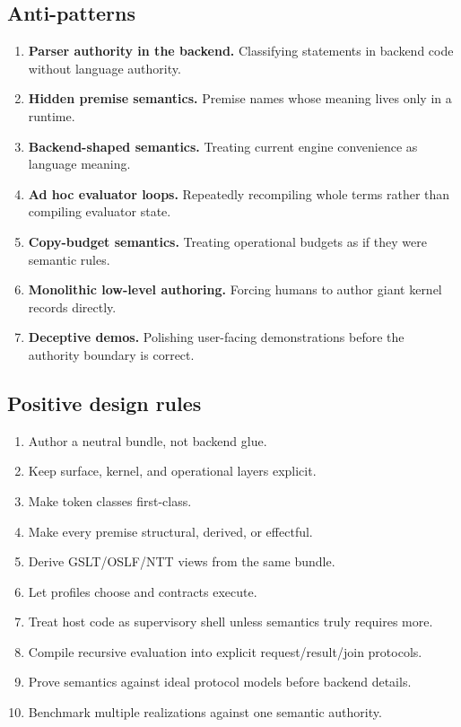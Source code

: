 \documentclass[11pt]{article}
\begin{document}
\subsection{Anti-patterns}

\begin{enumerate}[leftmargin=2em]
  \item \textbf{Parser authority in the backend.} Classifying statements in backend code without language authority.
  \item \textbf{Hidden premise semantics.} Premise names whose meaning lives only in a runtime.
  \item \textbf{Backend-shaped semantics.} Treating current engine convenience as language meaning.
  \item \textbf{Ad hoc evaluator loops.} Repeatedly recompiling whole terms rather than compiling evaluator state.
  \item \textbf{Copy-budget semantics.} Treating operational budgets as if they were semantic rules.
  \item \textbf{Monolithic low-level authoring.} Forcing humans to author giant kernel records directly.
  \item \textbf{Deceptive demos.} Polishing user-facing demonstrations before the authority boundary is correct.
\end{enumerate}

\subsection{Positive design rules}

\begin{enumerate}[leftmargin=2em]
  \item Author a neutral bundle, not backend glue.
  \item Keep surface, kernel, and operational layers explicit.
  \item Make token classes first-class.
  \item Make every premise structural, derived, or effectful.
  \item Derive GSLT/OSLF/NTT views from the same bundle.
  \item Let profiles choose and contracts execute.
  \item Treat host code as supervisory shell unless semantics truly requires more.
  \item Compile recursive evaluation into explicit request/result/join protocols.
  \item Prove semantics against ideal protocol models before backend details.
  \item Benchmark multiple realizations against one semantic authority.
\end{enumerate}
\end{document}
